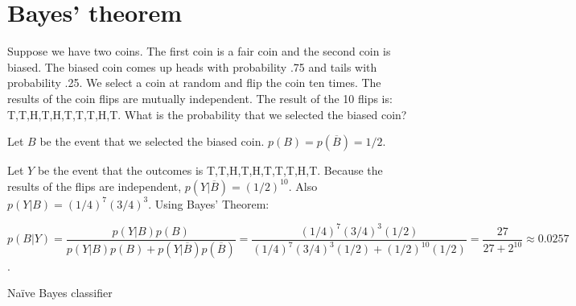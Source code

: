 \documentclass[]{exam}
\begin{document}
  \begin{center}
  \end{center}

  \section*{Bayes' theorem}

  \begin{questions}
    \question Suppose we have two coins. The first coin is a fair coin and the
      second coin is biased. The biased coin comes up heads with probability .75
      and tails with probability .25. We select a coin at random and flip the
      coin ten times. The results of the coin flips are mutually independent.
      The result of the 10 flips is: T,T,H,T,H,T,T,T,H,T. What is the
      probability that we selected the biased coin?
      \begin{solution}
        Let $B$ be the event that we selected the biased coin.
        $p(B)=p(\overline{B})=1/2$.

        Let $Y$ be the event that the outcomes is T,T,H,T,H,T,T,T,H,T. Because
        the results of the flips are independent, $p(Y|\overline{B}) =
        (1/2)^{10}$. Also $p(Y|B) = (1/4)^7(3/4)^3$. Using Bayes' Theorem:

        $p(B|Y)=\dfrac{p(Y|B)p(B)}{p(Y|B)p(B)+p(Y|\overline{B})p(\overline{B})}
        =\dfrac{(1/4)^7(3/4)^3(1/2)}{(1/4)^7(3/4)^3(1/2)+(1/2)^{10}(1/2)} =
        \dfrac{27}{27+2^{10}}\approx 0.0257$.
      \end{solution}

    \question Na\"{i}ve Bayes classifier

\end{questions}
\end{document}
